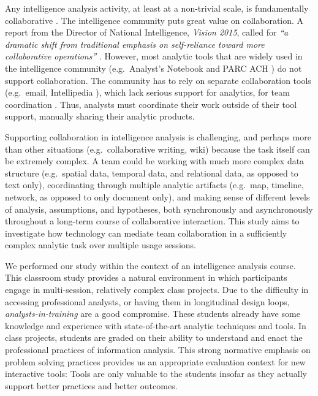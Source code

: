 Any intelligence analysis activity, at least at a non-trivial scale, is
fundamentally collaborative \cite{Convertino2011}. The intelligence community 
puts great value on collaboration. A report from the Director of National Intelligence, 
\emph{Vision 2015},  called for \emph{``a dramatic shift from traditional emphasis on 
self-reliance toward more collaborative operations''} \cite[p.13]{Vision2015}. 
However, most analytic tools that are widely used in the intelligence community 
(e.g.~Analyst's Notebook \cite{IBM} and PARC ACH \cite{PARC}) do not support 
collaboration. The community has to rely on separate collaboration tools (e.g.~email, Intellipedia \cite{Intelink2017}), which lack serious support for analytics, for team coordination \cite{Treverton2016}. Thus, analysts must coordinate their work outside 
of their tool support, manually sharing their analytic products. 

Supporting collaboration in intelligence analysis is challenging, and perhaps more than other situations (e.g.~collaborative writing, wiki) because the task itself can be extremely complex. A team could be working with much more complex data structure (e.g.~spatial data,
temporal data, and relational data, as opposed to text only), coordinating
through multiple analytic artifacts (e.g.~map, timeline, network, as opposed to
only document only), and making sense of different levels of analysis, assumptions,
and hypotheses, both synchronously and asynchronously throughout a long-term
course of collaborative interaction. This study aims to investigate how technology
can mediate team collaboration in a sufficiently complex analytic task over
multiple usage sessions.


We performed our study within
the context of an intelligence analysis course. This classroom study provides a
natural environment in which participants engage in multi-session, relatively
complex class projects. Due to the difficulty in accessing professional
analysts, or having them in longitudinal design loops,
\emph{analysts-in-training} are a good compromise. These students already have
some knowledge and experience with state-of-the-art analytic techniques and
tools. In class projects, students are graded on their ability to understand and
enact the professional practices of information analysis. This strong normative
emphasis on problem solving practices provides us an appropriate evaluation context for new
interactive tools: Tools are only valuable to the students insofar as they
actually support better practices and better outcomes.

